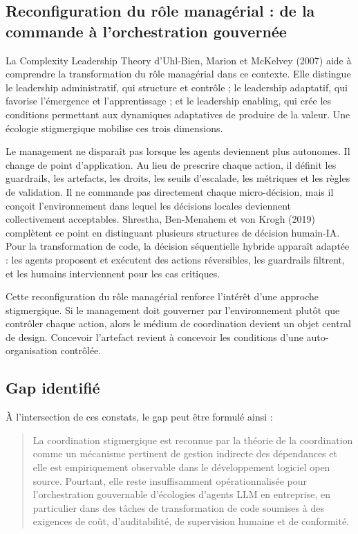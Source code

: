\subsection{Reconfiguration du rôle managérial : de la commande à l'orchestration gouvernée}\label{reconfiguration-du-ruxf4le-managuxe9rial-de-la-commande-uxe0-lorchestration-gouvernuxe9e}

La Complexity Leadership Theory d'Uhl-Bien, Marion et McKelvey (2007) aide à comprendre la transformation du rôle managérial dans ce contexte. Elle distingue le leadership administratif, qui structure et contrôle ; le leadership adaptatif, qui favorise l'émergence et l'apprentissage ; et le leadership enabling, qui crée les conditions permettant aux dynamiques adaptatives de produire de la valeur. Une écologie stigmergique mobilise ces trois dimensions.

Le management ne disparaît pas lorsque les agents deviennent plus autonomes. Il change de point d'application. Au lieu de prescrire chaque action, il définit les guardrails, les artefacts, les droits, les seuils d'escalade, les métriques et les règles de validation. Il ne commande pas directement chaque micro-décision, mais il conçoit l'environnement dans lequel les décisions locales deviennent collectivement acceptables. Shrestha, Ben-Menahem et von Krogh (2019) complètent ce point en distinguant plusieurs structures de décision humain-IA. Pour la transformation de code, la décision séquentielle hybride apparaît adaptée : les agents proposent et exécutent des actions réversibles, les guardrails filtrent, et les humains interviennent pour les cas critiques.

Cette reconfiguration du rôle managérial renforce l'intérêt d'une approche stigmergique. Si le management doit gouverner par l'environnement plutôt que contrôler chaque action, alors le médium de coordination devient un objet central de design. Concevoir l'artefact revient à concevoir les conditions d'une auto-organisation contrôlée.

\subsection{Gap identifié}\label{gap-identifiuxe9}

À l'intersection de ces constats, le gap peut être formulé ainsi :

\begin{quote}
La coordination stigmergique est reconnue par la théorie de la coordination comme un mécanisme pertinent de gestion indirecte des dépendances et elle est empiriquement observable dans le développement logiciel open source. Pourtant, elle reste insuffisamment opérationnalisée pour l'orchestration gouvernable d'écologies d'agents LLM en entreprise, en particulier dans des tâches de transformation de code soumises à des exigences de coût, d'auditabilité, de supervision humaine et de conformité.
\end{quote}

